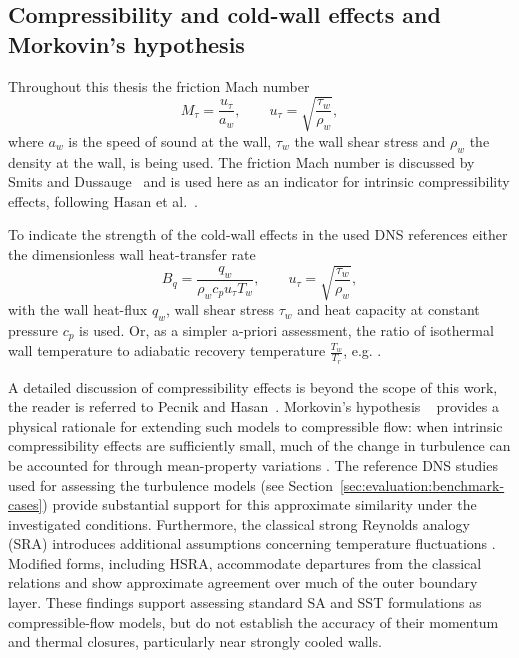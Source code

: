 \subsection{Compressibility and cold-wall effects and Morkovin's hypothesis}
\label{subsec:background:SRA-Morkovin}
Throughout this thesis the friction Mach number 
\begin{equation}
    M_\tau = \frac{u_\tau}{a_w},
    \qquad
    u_\tau = \sqrt{\frac{\tau_w}{\rho_w}},
\end{equation}
where \(a_w\) is the speed of sound at the wall, \(\tau_w\) the wall shear stress and \(\rho_w\) the density at the wall, is being used. The friction Mach number is discussed by Smits and Dussauge~\cite{smits2006turbulent} and is used here as an indicator for intrinsic compressibility effects, following Hasan et al.~\cite{hasan2025intrinsic}.
\par\medskip

To indicate the strength of the cold-wall effects in the used DNS references either the dimensionless wall heat-transfer rate
\begin{equation}
    B_q = \frac{q_w}{\rho_w c_p u_\tau T_w},
    \qquad
    u_\tau = \sqrt{\frac{\tau_w}{\rho_w}},
\end{equation}
with the wall heat-flux \(q_w\), wall shear stress \(\tau_w\) and heat capacity at constant pressure \(c_p\) is used. Or, as a simpler a-priori assessment, the ratio of isothermal wall temperature to adiabatic recovery temperature \(\frac{T_w}{T_r}\), e.g. \cite{zhang2018direct}.
\par\medskip

A detailed discussion of compressibility effects is beyond the scope of this work, the reader is referred to Pecnik and Hasan~\cite{pecnik2026turbulence}. Morkovin's hypothesis ~\cite{morkovin1962effects} provides a physical rationale for extending such models to compressible flow: when intrinsic compressibility effects are sufficiently small, much of the change in turbulence can be accounted for through mean-property variations \cite{fu2019turbulence}. The reference DNS studies used for assessing the turbulence models (see Section~\ref{sec:evaluation:benchmark-cases}) provide substantial support for this approximate similarity under the investigated conditions. Furthermore, the classical strong Reynolds analogy (SRA) introduces additional assumptions concerning temperature fluctuations \cite{huang2005direct}. Modified forms, including HSRA, accommodate departures from the classical relations and show approximate agreement over much of the outer boundary layer. These findings support assessing standard SA and SST formulations as compressible-flow models, but do not establish the accuracy of their momentum and thermal closures, particularly near strongly cooled walls.

